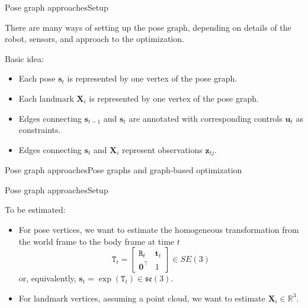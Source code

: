 \documentclass[aspectratio=169]{beamer}
\renewcommand{\vec}[1]{\boldsymbol{#1}}
\def\Rset{\mathbb{R}}
\newcommand{\lse}{\mathfrak{se}}
\newcommand{\myfig}[3]{\centerline{\texttt{[image: \#2]}}
    \centerline{\scriptsize \begin{minipage}{#1} \centering #3 \end{minipage}}}
\begin{document}
\begin{frame}{Pose graph approaches}{Setup}

  There are many ways of setting up the pose graph, depending on
  details of the robot, sensors, and approach to the optimization.

  \medskip

  Basic idea:
  \begin{itemize}
  \item \alert{Each pose} $\vec{s}_t$ is represented by \alert{one
    vertex} of the pose graph.
  \item \alert{Each landmark} $\vec{X}_i$ is represented by \alert{one
    vertex} of the pose graph.
  \item Edges connecting $\vec{s}_{t-1}$ and $\vec{s}_t$ are annotated
    with corresponding \alert{controls} $\vec{u}_t$ as constraints.
  \item Edges connecting $\vec{s}_t$ and $\vec{X}_i$ represent
    \alert{observations} $\vec{z}_{tj}$.
  \end{itemize}

\end{frame}


\begin{frame}{Pose graph approaches}{Pose graphs and graph-based optimization}


\end{frame}


\begin{frame}{Pose graph approaches}{Setup}

  To be estimated:
  \begin{itemize}
  \item For pose vertices, we want to estimate the homogeneous
    transformation from the world frame to the body frame at time $t$
    $$\mathtt{T}_t = 
    \begin{bmatrix} \mathtt{R}_{t} & \vec{t}_{t} \\ \vec{0}^{\top} & 1 \end{bmatrix} \in SE(3)$$
    or, equivalently, $\vec{s}_t = \exp(\mathtt{T}_t) \in \lse(3)$.
  \item For landmark vertices, assuming a point cloud, we want
    to estimate $\vec{X}_i \in \Rset^3$.
  \end{itemize}
  
\end{frame}
\end{document}
